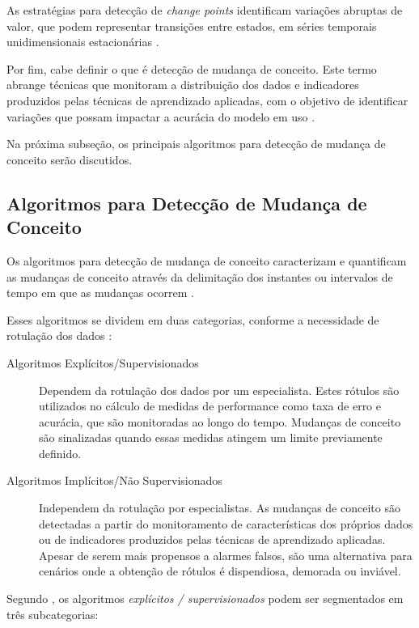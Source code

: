 \documentclass[qual, classic, a4paper]{ufbathesis}
\begin{document}
As estratégias para detecção de \textit{change points} identificam variações abruptas de valor, que podem representar transições entre estados, em séries temporais unidimensionais estacionárias \cite{Aminikhanghahi:2017:SMT:3086013.3086037}.

Por fim,  cabe definir o que é detecção de mudança de conceito.
Este termo abrange técnicas que monitoram a distribuição dos dados e indicadores produzidos pelas técnicas de aprendizado aplicadas, com o objetivo de identificar variações que possam impactar a acurácia do modelo em uso \cite{Gama:2014:SCD:2597757.2523813}.

Na próxima subseção, os principais algoritmos para detecção de mudança de conceito serão discutidos.

\subsection{Algoritmos para Detecção de Mudança de Conceito}

Os algoritmos para detecção de mudança de conceito caracterizam e quantificam as mudanças de conceito através da delimitação dos instantes ou intervalos de tempo em que as mudanças ocorrem \cite{Basseville:1993:DAC:151741}.

Esses algoritmos se dividem em duas categorias, conforme a necessidade de rotulação dos dados \cite{Zliobaite:2010}:

\begin{description}
    \item[Algoritmos Explícitos/Supervisionados] Dependem da rotulação dos dados por um especialista.
    Estes rótulos são utilizados no cálculo de medidas de performance como taxa de erro e acurácia, que são monitoradas ao longo do tempo.
    Mudanças de conceito são sinalizadas quando essas medidas atingem um limite previamente definido.

    \item[Algoritmos Implícitos/Não Supervisionados] Independem da rotulação por especialistas.
    As mudanças de conceito são detectadas a partir do monitoramento de características dos próprios dados ou de indicadores produzidos pelas técnicas de aprendizado aplicadas.
    Apesar de serem mais propensos a alarmes falsos, são uma alternativa para cenários onde a obtenção de rótulos é dispendiosa, demorada ou inviável.
\end{description}

Segundo , os algoritmos \textit{explícitos / supervisionados} podem ser segmentados em três subcategorias:
\end{document}
